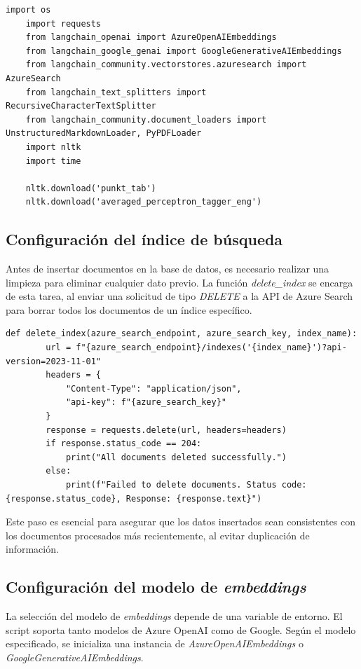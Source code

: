 \begin{lstlisting}[label=cod:update-db-1,caption=Importación de bibliotecas y configuración inicial.]
	import os
	import requests
	from langchain_openai import AzureOpenAIEmbeddings
	from langchain_google_genai import GoogleGenerativeAIEmbeddings
	from langchain_community.vectorstores.azuresearch import AzureSearch
	from langchain_text_splitters import RecursiveCharacterTextSplitter
	from langchain_community.document_loaders import UnstructuredMarkdownLoader, PyPDFLoader
	import nltk
	import time

	nltk.download('punkt_tab')
	nltk.download('averaged_perceptron_tagger_eng')
\end{lstlisting}

\subsection{Configuración del índice de búsqueda}

Antes de insertar documentos en la base de datos, es necesario realizar una limpieza para eliminar cualquier dato previo. La función 
\textit{delete\_index} se encarga de esta tarea, al enviar una solicitud de tipo \textit{DELETE} a la API de Azure Search para borrar todos 
los documentos de un índice específico.

\begin{lstlisting}[label=cod:update-db-2,caption=Configuración del índice de búsqueda.]
	def delete_index(azure_search_endpoint, azure_search_key, index_name):
		url = f"{azure_search_endpoint}/indexes('{index_name}')?api-version=2023-11-01"
		headers = {
			"Content-Type": "application/json",
			"api-key": f"{azure_search_key}"
		}
		response = requests.delete(url, headers=headers)
		if response.status_code == 204:
			print("All documents deleted successfully.")
		else:
			print(f"Failed to delete documents. Status code: {response.status_code}, Response: {response.text}")
\end{lstlisting}

Este paso es esencial para asegurar que los datos insertados sean consistentes con los documentos procesados más recientemente, al evitar 
duplicación de información.

\subsection{Configuración del modelo de \textit{embeddings}}

La selección del modelo de \textit{embeddings} depende de una variable de entorno. El script soporta tanto modelos de Azure OpenAI como de Google. 
Según el modelo especificado, se inicializa una instancia de \textit{AzureOpenAIEmbeddings} o \textit{GoogleGenerativeAIEmbeddings}.

